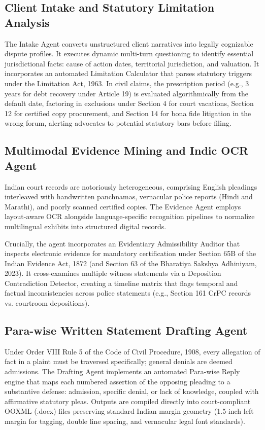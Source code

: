\documentclass[conference]{IEEEtran}
\begin{document}
\subsection{Client Intake and Statutory Limitation Analysis}
The Intake Agent converts unstructured client narratives into legally cognizable dispute profiles. It executes dynamic multi-turn questioning to identify essential jurisdictional facts: cause of action dates, territorial jurisdiction, and valuation. It incorporates an automated Limitation Calculator that parses statutory triggers under the Limitation Act, 1963. In civil claims, the prescription period (e.g., 3 years for debt recovery under Article 19) is evaluated algorithmically from the default date, factoring in exclusions under Section 4 for court vacations, Section 12 for certified copy procurement, and Section 14 for bona fide litigation in the wrong forum, alerting advocates to potential statutory bars before filing.

\subsection{Multimodal Evidence Mining and Indic OCR Agent}
Indian court records are notoriously heterogeneous, comprising English pleadings interleaved with handwritten panchnamas, vernacular police reports (Hindi and Marathi), and poorly scanned certified copies. The Evidence Agent employs layout-aware OCR alongside language-specific recognition pipelines to normalize multilingual exhibits into structured digital records. 

Crucially, the agent incorporates an Evidentiary Admissibility Auditor that inspects electronic evidence for mandatory certification under Section 65B of the Indian Evidence Act, 1872 (and Section 63 of the Bharatiya Sakshya Adhiniyam, 2023). It cross-examines multiple witness statements via a Deposition Contradiction Detector, creating a timeline matrix that flags temporal and factual inconsistencies across police statements (e.g., Section 161 CrPC records vs. courtroom depositions).

\subsection{Para-wise Written Statement Drafting Agent}
Under Order VIII Rule 5 of the Code of Civil Procedure, 1908, every allegation of fact in a plaint must be traversed specifically; general denials are deemed admissions. The Drafting Agent implements an automated Para-wise Reply engine that maps each numbered assertion of the opposing pleading to a substantive defense: admission, specific denial, or lack of knowledge, coupled with affirmative statutory pleas. Outputs are compiled directly into court-compliant OOXML (.docx) files preserving standard Indian margin geometry (1.5-inch left margin for tagging, double line spacing, and vernacular legal font standards).
\end{document}

